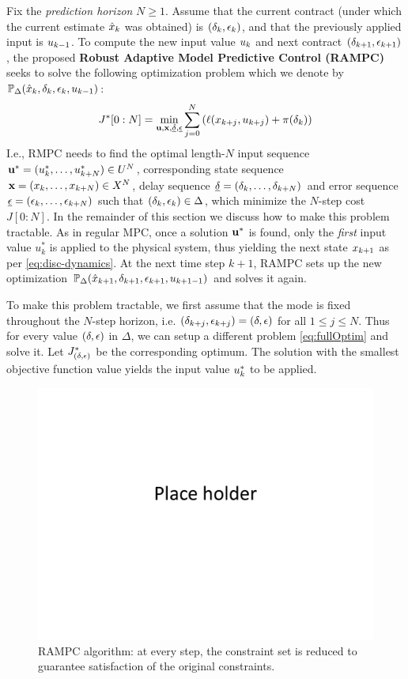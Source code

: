 Fix the \emph{prediction horizon} $N \geq 1$.
Assume that the current contract (under which the current estimate $\hat{x}_k$ was obtained) is $(\delta_{k},\epsilon_{k})$, and that the previously applied input is $u_{k-1}$.
To compute the new input value $u_{k}$ and next contract $(\delta_{k+1},\epsilon_{k+1})$, the proposed \textbf{Robust Adaptive Model Predictive Control (RAMPC)} seeks to solve the following optimization problem which we denote by $\mathbb{P}_{\Delta}(\hat{x}_{k},\delta_{k},\epsilon_{k},u_{k -1})$:
\begin{eqnarray}
\label{eq:fullOptim}
J^*[0:N]= \min_{\mathbf{u},\mathbf{x},\underline{\delta},\underline{\epsilon}}\sum_{j=0}^{N}\left(\ell(x_{k+j},u_{k+j})+\pi(\delta_k)\right)
\end{eqnarray}
I.e., RMPC needs to find the optimal length-$N$ input sequence  $\mathbf{u}^* = (u_k^*,\ldots,u_{k+N}^*) \in U^N$, corresponding state sequence $\mathbf{x} = (x_k,\ldots,x_{k+N}) \in X^N$, delay sequence $\underline{\delta} = (\delta_k,\ldots,\delta_{k+N})$ and error sequence $\underline{\epsilon} = (\epsilon_k,\ldots,\epsilon_{k+N})$ such that $(\delta_{k},\epsilon_{k}) \in \Delta$, which minimize the $N$-step cost $J[0:N]$.
In the remainder of this section we discuss how to make this problem tractable.
As in regular MPC, once a solution $\mathbf{u}^*$ is found, only the \emph{first} input value $u_k^*$ is applied to the physical system, thus yielding the next state $x_{k+1}$ as per \eqref{eq:disc-dynamics}.
At the next time step $k+1$, RAMPC sets up the new optimization $\mathbb{P}_{\Delta}(\hat{x}_{k+1},\delta_{k+1},\epsilon_{k+1},u_{k+1 -1})$ and solves it again.

To make this problem tractable, we first assume that the mode is fixed throughout the $N$-step horizon, i.e. $(\delta_{k+j},\epsilon_{k+j}) = (\delta,\epsilon)$ for all $1 \leq j \leq N$.
Thus for every value $(\delta,\epsilon)$ in $\Delta$, we can setup a different problem \eqref{eq:fullOptim} and solve it.
Let $J_{(\delta,\epsilon)}^*$ be the corresponding optimum.
The solution with the smallest objective function value yields the input value $u^*_k$ to be applied.

\begin{figure}[t]
\centering
\includegraphics[width=0.7\linewidth]{figures/placeHolder}
\caption{RAMPC algorithm: at every step, the constraint set is reduced to guarantee satisfaction of the original constraints.}
\label{fig:placeHolder}
\end{figure}

